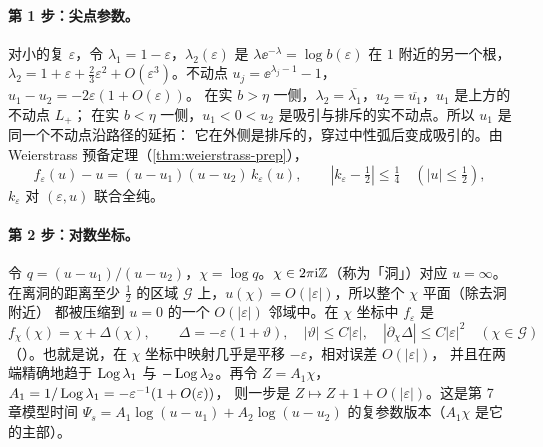 \paragraph{第 1 步：尖点参数。}
对小的复 $\varepsilon$，令 $\lambda_1=1-\varepsilon$，$\lambda_2(\varepsilon)$ 是 $\lambda\ee^{-\lambda}=\log b(\varepsilon)$ 在 $1$ 附近的另一个根，
$\lambda_2=1+\varepsilon+\tfrac23\varepsilon^2+O(\varepsilon^3)$。不动点 $u_j=\ee^{\lambda_j-1}-1$，$u_1-u_2=-2\varepsilon(1+O(\varepsilon))$。
在实 $b>\eta$ 一侧，$\lambda_2=\overline{\lambda_1}$，$u_2=\overline{u_1}$，$u_1$ 是上方的不动点 $L_+$；
在实 $b<\eta$ 一侧，$u_1<0<u_2$ 是吸引与排斥的实不动点。所以 $u_1$ 是同一个不动点沿路径的延拓：
它在外侧是排斥的，穿过中性弧后变成吸引的。由 Weierstrass 预备定理（\cref{thm:weierstrass-prep}），
\[
  f_\varepsilon(u)-u=(u-u_1)(u-u_2)\,k_\varepsilon(u),\qquad |k_\varepsilon-\tfrac12|\le\tfrac14\quad(|u|\le\tfrac12),
\]
$k_\varepsilon$ 对 $(\varepsilon,u)$ 联合全纯。

\paragraph{第 2 步：对数坐标。}
令 $q=(u-u_1)/(u-u_2)$，$\chi=\log q$。$\chi\in2\pi\mathrm{i}\mathbb{Z}$（称为「洞」）对应 $u=\infty$。
在离洞的距离至少 $\tfrac12$ 的区域 $\mathcal G$ 上，$u(\chi)=O(|\varepsilon|)$，所以整个 $\chi$ 平面（除去洞附近）
都被压缩到 $u=0$ 的一个 $O(|\varepsilon|)$ 邻域中。在 $\chi$ 坐标中 $f_\varepsilon$ 是
\[
  f_\chi(\chi)=\chi+\Delta(\chi),\qquad \Delta=-\varepsilon(1+\vartheta),\quad |\vartheta|\le C|\varepsilon|,\quad |\partial_\chi\Delta|\le C|\varepsilon|^2
  \quad(\chi\in\mathcal G)
\]
（\cite[引理~10.2]{KneserPaper}）。也就是说，在 $\chi$ 坐标中映射几乎是平移 $-\varepsilon$，相对误差 $O(|\varepsilon|)$，
并且在两端精确地趋于 $\operatorname{Log}\lambda_1$ 与 $-\operatorname{Log}\lambda_2$。再令 $Z=A_1\chi$，$A_1=1/\operatorname{Log}\lambda_1=-\varepsilon^{-1}(1+O(\varepsilon))$，
则一步是 $Z\mapsto Z+1+O(|\varepsilon|)$。这是第 7 章模型时间 $\Psi_s=A_1\log(u-u_1)+A_2\log(u-u_2)$ 的复参数版本（$A_1\chi$ 是它的主部）。

